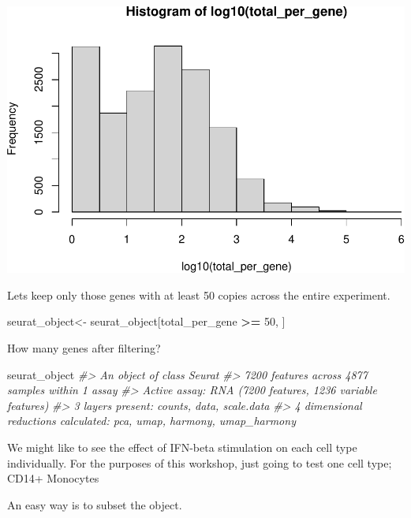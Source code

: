 \documentclass[
]{book}
\newenvironment{Shaded}{\begin{snugshade}}{\end{snugshade}}
\newcommand{\AttributeTok}[1]{\textcolor[rgb]{0.13,0.29,0.53}{#1}}
\newcommand{\CommentTok}[1]{\textcolor[rgb]{0.56,0.35,0.01}{\textit{#1}}}
\newcommand{\DecValTok}[1]{\textcolor[rgb]{0.00,0.00,0.81}{#1}}
\newcommand{\FunctionTok}[1]{\textcolor[rgb]{0.13,0.29,0.53}{\textbf{#1}}}
\newcommand{\NormalTok}[1]{#1}
\newcommand{\OtherTok}[1]{\textcolor[rgb]{0.56,0.35,0.01}{#1}}
\newcommand{\SpecialCharTok}[1]{\textcolor[rgb]{0.81,0.36,0.00}{\textbf{#1}}}
\newcommand{\StringTok}[1]{\textcolor[rgb]{0.31,0.60,0.02}{#1}}
\begin{document}
\includegraphics{scRNAseqInR_ABACBS_2024_Doco_files/figure-latex/unnamed-chunk-45-1.pdf}

Lets keep only those genes with at least 50 copies across the entire experiment.

\begin{Shaded}
\begin{Highlighting}[]
\NormalTok{seurat\_object}\OtherTok{\textless{}{-}}\NormalTok{ seurat\_object[total\_per\_gene }\SpecialCharTok{\textgreater{}=} \DecValTok{50}\NormalTok{, ] }
\end{Highlighting}
\end{Shaded}

How many genes after filtering?

\begin{Shaded}
\begin{Highlighting}[]
\NormalTok{seurat\_object}
\CommentTok{\#\textgreater{} An object of class Seurat }
\CommentTok{\#\textgreater{} 7200 features across 4877 samples within 1 assay }
\CommentTok{\#\textgreater{} Active assay: RNA (7200 features, 1236 variable features)}
\CommentTok{\#\textgreater{}  3 layers present: counts, data, scale.data}
\CommentTok{\#\textgreater{}  4 dimensional reductions calculated: pca, umap, harmony, umap\_harmony}
\end{Highlighting}
\end{Shaded}

We might like to see the effect of IFN-beta stimulation on each cell type individually. For the purposes of this workshop, just going to test one cell type; CD14+ Monocytes

An easy way is to subset the object.

\begin{Shaded}
\end{Shaded}
\end{document}
